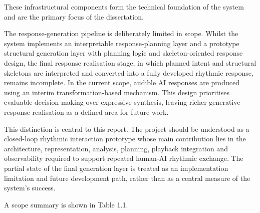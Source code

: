 These infrastructural components form the technical foundation of the
system and are the primary focus of the dissertation.

The response-generation pipeline is deliberately limited in scope.
Whilst the system implements an interpretable response-planning layer
and a prototype structural generation layer with planning logic and
skeleton-oriented response design, the final response realisation stage,
in which planned intent and structural skeletons are interpreted and
converted into a fully developed rhythmic response, remains incomplete.
In the current scope, audible AI responses are produced using an interim
transformation-based mechanism. This design prioritises evaluable
decision-making over expressive synthesis, leaving richer generative
response realisation as a defined area for future work.

This distinction is central to this report. The project should be
understood as a closed-loop rhythmic interaction prototype whose main
contribution lies in the architecture, representation, analysis,
planning, playback integration and observability required to support
repeated human-AI rhythmic exchange. The partial state of the final
generation layer is treated as an implementation limitation and future
development path, rather than as a central measure of the system's
success.

A scope summary is shown in Table 1.1.

